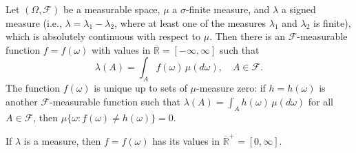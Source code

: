 Let $(\Omega, \mathcal{F})$ be a measurable space, $\mu$ a $\sigma$-finite measure, and $\lambda$ a signed measure (i.e., $\lambda = \lambda_1 - \lambda_2$, where at least one of the measures $\lambda_1$ and $\lambda_2$ is finite), which is absolutely continuous with respect to $\mu$. Then there is an $\mathcal{F}$-measurable function $f = f(\omega)$ with values in $\overline{\mathbb{R}} = [-\infty, \infty]$ such that
$$\lambda(A) = \int_A f(\omega) \, \mu(d\omega), \quad A \in \mathcal{F}.$$
The function $f(\omega)$ is unique up to sets of $\mu$-measure zero: if $h = h(\omega)$ is another $\mathcal{F}$-measurable function such that $\lambda(A) = \int_A h(\omega) \, \mu(d\omega)$ for all $A \in \mathcal{F}$, then $\mu\{\omega : f(\omega) \neq h(\omega)\} = 0$.

If $\lambda$ is a measure, then $f = f(\omega)$ has its values in $\overline{\mathbb{R}}^+ = [0, \infty]$.
